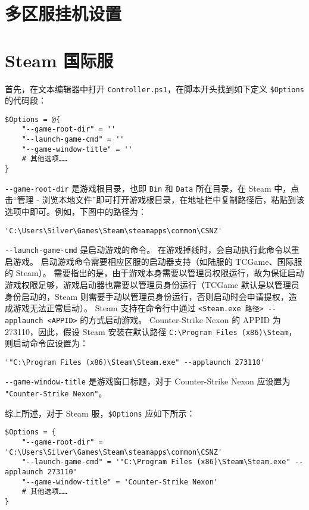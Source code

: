 \section{多区服挂机设置}

\section{Steam 国际服}

首先，在文本编辑器中打开 \lstinline{Controller.ps1}，在脚本开头找到如下定义 \verb|$Options| 的代码段：

\begin{verbatim}
$Options = @{
	"--game-root-dir" = ''
	"--launch-game-cmd" = ''
	"--game-window-title" = ''
	# 其他选项……
}
\end{verbatim}

\verb|--game-root-dir| 是游戏根目录，也即 \verb|Bin| 和 \verb|Data| 所在目录，在 Steam 中，点击“管理 - 浏览本地文件”即可打开游戏根目录，在地址栏中复制路径后，粘贴到该选项中即可。例如，下图中的路径为：

\begin{verbatim}
'C:\Users\Silver\Games\Steam\steamapps\common\CSNZ'
\end{verbatim}

\verb|--launch-game-cmd| 是启动游戏的命令。
在游戏掉线时，会自动执行此命令以重启游戏。
启动游戏命令需要相应区服的启动器支持（如陆服的 TCGame、国际服的 Steam）。
需要指出的是，由于游戏本身需要以管理员权限运行，故为保证启动游戏权限足够，游戏启动器也需要以管理员身份运行（TCGame 默认是以管理员身份启动的，Steam 则需要手动以管理员身份运行，否则启动时会申请提权，造成游戏无法正常启动）。
Steam 支持在命令行中通过 \verb|<Steam.exe 路径> --applaunch <APPID>| 的方式启动游戏。
Counter-Strike Nexon 的 APPID 为 273110，因此，假设 Steam 安装在默认路径 \verb|C:\Program Files (x86)\Steam|，则启动命令应设置为：

\begin{verbatim}
'"C:\Program Files (x86)\Steam\Steam.exe" --applaunch 273110'
\end{verbatim}

\verb|--game-window-title| 是游戏窗口标题，对于 Counter-Strike Nexon 应设置为 \verb|"Counter-Strike Nexon"|。

综上所述，对于 Steam 服，\verb|$Options| 应如下所示：

\begin{verbatim}
$Options = {
	"--game-root-dir" = 'C:\Users\Silver\Games\Steam\steamapps\common\CSNZ'
	"--launch-game-cmd" = '"C:\Program Files (x86)\Steam\Steam.exe" --applaunch 273110'
	"--game-window-title" = 'Counter-Strike Nexon'
	# 其他选项……
}
\end{verbatim}